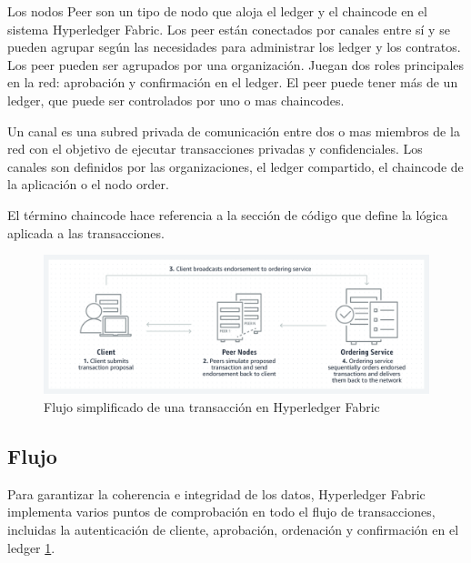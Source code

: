 Los nodos Peer son un tipo de nodo que aloja el ledger y el chaincode en el sistema Hyperledger Fabric. Los peer están conectados por canales entre sí y se pueden agrupar según las necesidades para administrar los ledger y los contratos. Los peer pueden ser agrupados por una organización. Juegan dos roles principales en la red: aprobación y confirmación en el ledger. El peer puede tener más de un ledger, que puede ser controlados por uno o mas chaincodes.

Un canal es una subred privada de comunicación entre dos o mas miembros de la red con el objetivo de ejecutar transacciones privadas y confidenciales. Los canales son definidos por las organizaciones, el ledger compartido, el chaincode de la aplicación o el nodo order.

El término chaincode hace referencia a la sección de código que define la lógica aplicada a las transacciones.

\begin{figure}[h!]
	\includegraphics[width=\linewidth]{Graphics/hyp_fab_diagram.png}
	\caption{Flujo simplificado de una transacción en Hyperledger Fabric}
	\label{fig:3}
\end{figure}

\subsection{Flujo}
Para garantizar la coherencia e integridad de los datos, Hyperledger Fabric implementa varios puntos de comprobación en todo el flujo de transacciones, incluidas la autenticación de cliente, aprobación, ordenación y confirmación en el ledger \ref{fig:3}.

